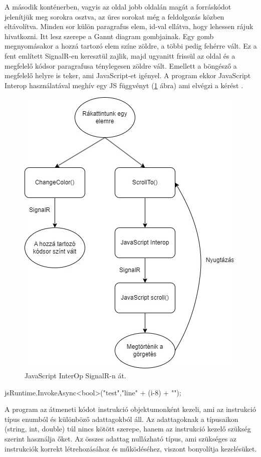 A második konténerben, vagyis az oldal jobb oldalán magát a forráskódot jelenítjük meg sorokra osztva, az üres sorokat még a feldolgozás közben eltávolítva. Minden sor külön paragrafus elem, id-val ellátva, hogy lehessen rájuk hivatkozni. Itt lesz szerepe a Gannt diagram gombjainak. Egy gomb megnyomásakor a hozzá tartozó elem színe zöldre, a többi pedig fehérre vált. Ez a fent említett SignalR-en keresztül zajlik, majd ugyanitt frissül az oldal és a megfelelő kódsor paragrafusa ténylegesen zöldre vált. Emellett a böngésző a megfelelő helyre is teker, ami JavaScript-et igényel. A program ekkor JavaScript Interop használatával meghív egy JS függvényt (\ref{fig:jspl} ábra) ami elvégzi a kérést \cite{js_interop}.

\begin{figure}[h]
\centering
\includegraphics[scale=0.5]{images/JSpl.jpg}
\caption{JavaScript InterOp SignalR-n át.}
\label{fig:jspl}
\end{figure}

\begin{cpp}
jsRuntime.InvokeAsync<bool>("test","line{" + (i-8) + "}");
\end{cpp}

\newpage
{}
A program az átmeneti kódot instrukció objektumonként kezeli, ami az instrukció típus enumból és különböző adattagokból áll. Az adattagoknak a típusaikon (string, int, double) túl nincs kötött szerepe, hanem az instrukció kezelő szükség szerint használja őket. Az összes adattag nullázható típus, ami szükséges az instrukciók korrekt létrehozásához és működéséhez, viszont bonyolítja kezelésüket.

